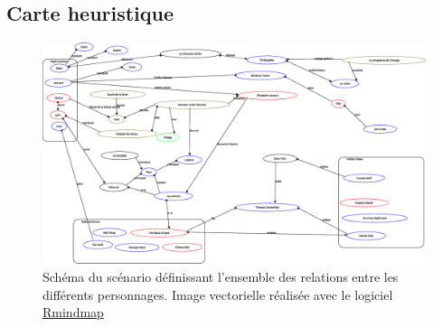 \documentclass[oneside,12pt]{book}
\begin{document}
\begin{flushleft}
\section{Carte heuristique}  
\begin{figure}[!ht]
\includegraphics[width=\textwidth]{canada_2.eps}
\caption{Schéma du scénario définissant l'ensemble des relations entre les différents personnages. Image vectorielle réalisée avec le logiciel \href{https://github.com/obiwankennedy/rmindmap}{Rmindmap}}
\label{fig:mindmap}
\end{figure}

\end{flushleft}
\end{document}
